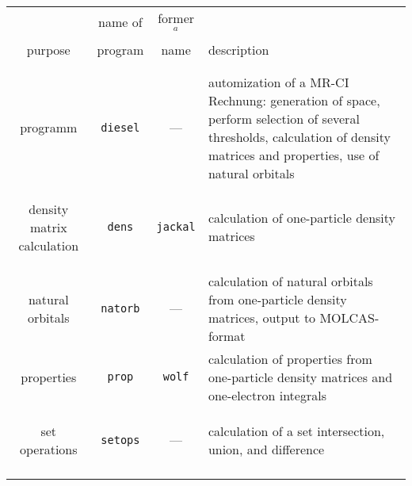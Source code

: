 \begin{table}[h]
\begin{center}
\begin{tabular}{c|c|c|p{6cm}}
&name of &former$^a$ &\\
purpose &program &name &description\\[5pt]
\hline&&&\\[-9pt]
\begin{minipage}[t]{2.5cm}
\begin{center}
control\\programm
\end{center}
\end{minipage}
& {\tt diesel} & --- &automization of a MR-CI Rechnung:
generation of space,
perform selection of several thresholds,
calculation of density matrices and properties,
use of natural orbitals
\\[5pt]
\begin{minipage}[t]{2.5cm}
\begin{center}
density matrix calculation
\end{center}
\end{minipage}
& {\tt dens} & {\tt jackal} &calculation of one-particle
density matrices
\\[5pt]
\begin{minipage}[t]{2.5cm}
\begin{center}
natural orbitals
\end{center}
\end{minipage}
& {\tt natorb} & --- &calculation of natural orbitals
from one-particle density matrices, output to MOLCAS-format
\\[5pt]
\begin{minipage}[t]{2.5cm}
\begin{center}
properties
\end{center}
\end{minipage}
& {\tt prop} & {\tt wolf} &calculation of properties from
one-particle density matrices and one-electron integrals
\\[5pt]
\begin{minipage}[t]{2.5cm}
\begin{center}
set operations
\end{center}
\end{minipage}
& {\tt setops} & --- &calculation of a set intersection, union,
and difference
\\[5pt]
\begin{minipage}[t]{2.5cm}
\begin{center}

\end{center}
\end{minipage}
\end{tabular}
\end{center}
\end{table}
